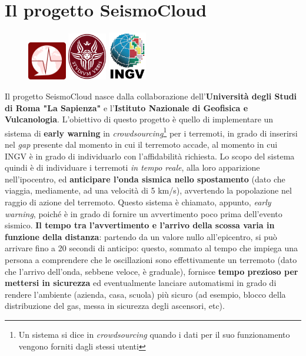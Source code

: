 \documentclass[a4paper,10pt]{memoir}
\begin{document}
\pagebreak

\section{Il progetto SeismoCloud}

\begin{figure}
\centering
\label{fig:seismocloudlogos}
\includegraphics[width=0.15\textwidth]{app/seismocloud}
\includegraphics[width=0.15\textwidth]{logo-sapienza-mini}
\includegraphics[width=0.15\textwidth]{app/ingv}
\end{figure}

Il progetto SeismoCloud nasce dalla collaborazione dell'\textbf{Università degli Studi di Roma "La Sapienza"} e l'\textbf{Istituto Nazionale di Geofisica e Vulcanologia}. L'obiettivo di questo progetto è quello di implementare un sistema di \textbf{early warning} in \textit{crowdsourcing}\footnote{Un sistema si dice in \textit{crowdsourcing} quando i dati per il suo funzionamento vengono forniti dagli stessi utenti} per i terremoti, in grado di inserirsi nel \textit{gap} presente dal momento in cui il terremoto accade, al momento in cui INGV è in grado di individuarlo con l'affidabilità richiesta. Lo scopo del sistema quindi è di individuare i terremoti \textit{in tempo reale}, alla loro apparizione nell'ipocentro, ed \textbf{anticipare l'onda sismica nello spostamento} (dato che viaggia, mediamente, ad una velocità di 5 km/s), avvertendo la popolazione nel raggio di azione del terremoto. Questo sistema è chiamato, appunto, \textit{early warning}, poiché è in grado di fornire un avvertimento poco prima dell'evento sismico. \textbf{Il tempo tra l'avvertimento e l'arrivo della scossa varia in funzione della distanza}: partendo da un valore nullo all'epicentro, si può arrivare fino a 20 secondi di anticipo: questo, sommato al tempo che impiega una persona a comprendere che le oscillazioni sono effettivamente un terremoto (dato che l'arrivo dell'onda, sebbene veloce, è graduale), fornisce \textbf{tempo prezioso per mettersi in sicurezza} ed eventualmente lanciare automatismi in grado di rendere l'ambiente (azienda, casa, scuola) più sicuro (ad esempio, blocco della distribuzione del gas, messa in sicurezza degli ascensori, etc).
\end{document}
